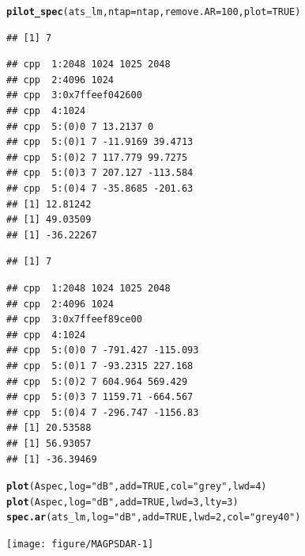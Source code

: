 \documentclass[10pt]{article}\usepackage[]{graphicx}\usepackage[]{color}
\makeatletter
\newcommand{\hlnum}[1]{\textcolor[rgb]{0.686,0.059,0.569}{#1}}%
\newcommand{\hlstr}[1]{\textcolor[rgb]{0.192,0.494,0.8}{#1}}%
\newcommand{\hlstd}[1]{\textcolor[rgb]{0.345,0.345,0.345}{#1}}%
\newcommand{\hlkwc}[1]{\textcolor[rgb]{0.333,0.667,0.333}{#1}}%
\newcommand{\hlkwd}[1]{\textcolor[rgb]{0.737,0.353,0.396}{\textbf{#1}}}%
\newenvironment{kframe}{%
 \def\at@end@of@kframe{}%
 \ifinner\ifhmode%
  \def\at@end@of@kframe{\end{minipage}}%
  \begin{minipage}{\columnwidth}%
 \fi\fi%
 \def\FrameCommand##1{\hskip\@totalleftmargin \hskip-\fboxsep
 \colorbox{shadecolor}{##1}\hskip-\fboxsep
     \hskip-\linewidth \hskip-\@totalleftmargin \hskip\columnwidth}%
 \MakeFramed {\advance\hsize-\width
   \@totalleftmargin\z@ \linewidth\hsize
   \@setminipage}}%
 {\par\unskip\endMakeFramed%
 \at@end@of@kframe}
\newenvironment{knitrout}{}{} %
\makeatother
\begin{document}
\begin{figure}[h!]
\begin{center}
\begin{knitrout}\small
{}\color{fgcolor}\begin{kframe}
\begin{alltt}
\hlkwd{pilot_spec}\hlstd{(ats_lm,} \hlkwc{ntap} \hlstd{= ntap,} \hlkwc{remove.AR} \hlstd{=} \hlnum{100}\hlstd{,} \hlkwc{plot} \hlstd{=} \hlnum{TRUE}\hlstd{)}
\end{alltt}


{\ttfamily\noindent\itshape\color{messagecolor}{\#\# tap c A 1 1024}}\begin{verbatim}
## [1] 7
\end{verbatim}


{\ttfamily\noindent\itshape\color{messagecolor}{\#\# f creation}}\begin{verbatim}
## cpp  1:2048 1024 1025 2048
## cpp  2:4096 1024
## cpp  3:0x7ffeef042600
## cpp  4:1024
## cpp  5:(0)0 7 13.2137 0
## cpp  5:(0)1 7 -11.9169 39.4713
## cpp  5:(0)2 7 117.779 99.7275
## cpp  5:(0)3 7 207.127 -113.584
## cpp  5:(0)4 7 -35.8685 -201.63
## [1] 12.81242
## [1] 49.03509
## [1] -36.22267
\end{verbatim}


{\ttfamily\noindent\itshape\color{messagecolor}{\#\# tap c A 1 1024}}\begin{verbatim}
## [1] 7
\end{verbatim}


{\ttfamily\noindent\itshape\color{messagecolor}{\#\# f creation}}\begin{verbatim}
## cpp  1:2048 1024 1025 2048
## cpp  2:4096 1024
## cpp  3:0x7ffeef89ce00
## cpp  4:1024
## cpp  5:(0)0 7 -791.427 -115.093
## cpp  5:(0)1 7 -93.2315 227.168
## cpp  5:(0)2 7 604.964 569.429
## cpp  5:(0)3 7 1159.71 -664.567
## cpp  5:(0)4 7 -296.747 -1156.83
## [1] 20.53588
## [1] 56.93057
## [1] -36.39469
\end{verbatim}
\begin{alltt}
\hlkwd{plot}\hlstd{(Aspec,} \hlkwc{log} \hlstd{=} \hlstr{"dB"}\hlstd{,} \hlkwc{add} \hlstd{=} \hlnum{TRUE}\hlstd{,} \hlkwc{col} \hlstd{=} \hlstr{"grey"}\hlstd{,} \hlkwc{lwd} \hlstd{=} \hlnum{4}\hlstd{)}
\hlkwd{plot}\hlstd{(Aspec,} \hlkwc{log} \hlstd{=} \hlstr{"dB"}\hlstd{,} \hlkwc{add} \hlstd{=} \hlnum{TRUE}\hlstd{,} \hlkwc{lwd} \hlstd{=} \hlnum{3}\hlstd{,} \hlkwc{lty} \hlstd{=} \hlnum{3}\hlstd{)}
\hlkwd{spec.ar}\hlstd{(ats_lm,} \hlkwc{log} \hlstd{=} \hlstr{"dB"}\hlstd{,} \hlkwc{add} \hlstd{=} \hlnum{TRUE}\hlstd{,} \hlkwc{lwd} \hlstd{=} \hlnum{2}\hlstd{,} \hlkwc{col} \hlstd{=} \hlstr{"grey40"}\hlstd{)}
\end{alltt}
\end{kframe}
\texttt{[image: figure/MAGPSDAR-1]} 


\end{knitrout}
\end{center}
\end{figure}
\end{document}
